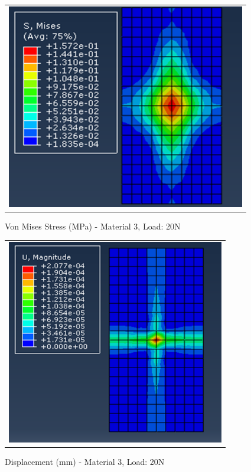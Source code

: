 \documentclass[a4paper,12pt]{article}
\numberwithin{equation}{section}
\numberwithin{figure}{section}
\begin{document}
\begin{figure}[H]
  \centering
  \begin{tabular}{@{}c@{}}
    \includegraphics[width=0.7\linewidth,height=255pt]{Results/Point Loading/M3_VMS_L4.png} \\
  \end{tabular}
  \caption{Von Mises Stress (MPa) - Material 3, Load: 20N}
\end{figure}

\begin{figure}[H]
  \centering
  \begin{tabular}{@{}c@{}}
    \includegraphics[width=0.7\linewidth,height=255pt]{Results/Point Loading/M3_DIS_L4.png} \\
  \end{tabular}
  \caption{Displacement (mm) - Material 3, Load: 20N}
\end{figure}
\end{document}
